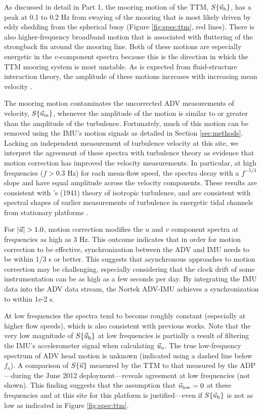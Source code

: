 As discussed in detail in Part 1, the mooring motion of the TTM, $S\{\vec{u}_\mathrm{h}\}$, has a peak at 0.1 to 0.2 Hz from swaying of the mooring that is most likely driven by eddy shedding from the spherical buoy (Figure \ref{fig:spec:ttm}, red lines). There is also higher-frequency broadband motion that is associated with fluttering of the strongback fin around the mooring line. Both of these motions are especially energetic in the $v$-component spectra because this is the direction in which the TTM mooring system is most unstable. As is expected from fluid-structure interaction theory, the amplitude of these motions increases with increasing mean velocity \cite[]{Morison++1950}.

The mooring motion contaminates the uncorrected ADV measurements of velocity, $S\{\vec{u}_\mathrm{m}\}$, whenever the amplitude of the motion is similar to or greater than the amplitude of the turbulence. Fortunately, much of this motion can be removed using the IMU's motion signals as detailed in Section \ref{sec:methods}. Lacking an independent measurement of turbulence velocity at this site, we interpret the agreement of these spectra with turbulence theory as evidence that motion correction has improved the velocity measurements. In particular, at high frequencies ($f>0.3$ Hz) for each mean-flow speed, the spectra decay with a $f^{-5/3}$ slope and have equal amplitude across the velocity components. These results are consistent with \citeauthor{Kolmogorov1941c}'s (1941) theory of isotropic turbulence, and are consistent with spectral shapes of earlier measurements of turbulence in energetic tidal channels from stationary platforms \cite[]{Walter++2011, Thomson++2012, McMillan++2016}.

For $|\ue|>1.0$, motion correction modifies the $u$ and $v$ component spectra at frequencies as high as 3 Hz. This outcome indicates that in order for motion correction to be effective, synchronization between the ADV and IMU needs to be within 1/3 s or better. This suggests that asynchronous approaches to motion correction may be challenging, especially considering that the clock drift of some instrumentation can be as high as a few seconds per day. By integrating the IMU data into the ADV data stream, the Nortek ADV-IMU achieves a synchronization to within 1e-2 s. 

At low frequencies the spectra tend to become roughly constant (especially at higher flow speeds), which is also consistent with previous works. Note that the very low magnitude of $S\{\vec{u}_\mathrm{h}\}$ at low frequencies is partially a result of filtering the IMU's accelerometer signal when calculating $\vec{u}_a$. The true low-frequency spectrum of ADV head motion is unknown (indicated using a dashed line below $f_a$). A comparison of $S\{\vec{u}\}$ measured by the TTM to that measured by the ADP---during the June 2012 deployment---reveals agreement at low frequencies (not shown). This finding suggests that the assumption that $\vec{u}_\mathrm{low}=0$ at these frequencies and at this site for this platform is justified---even if $S\{\vec{u}_\mathrm{h}\}$ is not as low as indicated in Figure \ref{fig:spec:ttm}.

